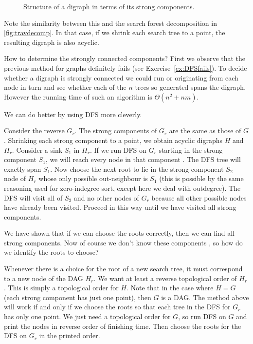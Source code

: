 \begin{figure}[htbp]
%
\caption{Structure of a digraph in terms of its strong components.}
\label{fig:sccdecomp}
\end{figure}

Note the similarity between this and the search forest decomposition
in \cref{fig:travdecomp}. In that case, if we shrink each
search tree to a point, the resulting digraph is also acyclic.

How to determine the strongly connected components? First we observe
that the previous method for graphs definitely fails (see
Exercise~\ref{ex:DFSfails}). To decide whether a digraph is strongly
connected we could run  or 
originating from each node in turn and see whether each of the $n$ trees
so generated spans the digraph. However the running time of such an
algorithm is $\Theta(n^2+nm)$.

We can do better by using DFS more cleverly. 

Consider the reverse $G_r$. The strong components of $G_r$ are the
same as those of $G$. Shrinking each strong component to a point,
we obtain  acyclic digraphs $H$ and $H_r$. Consider a sink $S_1$ in
$H_r$. If we run DFS on $G_r$ starting  in the strong component
$S_1$, we will reach every node in that component . The DFS tree will exactly span $S_1$. Now
choose the next root to lie in the strong component $S_2$ node of
$H_r$ whose only possible out-neighbour is $S_1$ (this is possible
by the same reasoning used for zero-indegree sort, except here we
deal with outdegree). The DFS will visit all of $S_2$ and no other
nodes of $G_r$ because all other possible nodes have already been
visited. Proceed in this way until we have visited all strong
components.

We have shown that if we can choose the roots correctly, then we can
find all strong components. Now of course we don't know these components
, so how do we identify the roots to choose?

Whenever there is a choice for the root of a new search tree, it must
correspond to a new node of the DAG $H_r$. We want at least a reverse
topological order of $H_r$. This is simply a topological order for
$H$. Note that in the case where $H=G$ (each strong component has just
one point), then $G$ is a DAG. The method above will work if and only
if we choose the roots so that each tree in the DFS for $G_r$ has only
one point. We just need a topological order for $G$, so run DFS on $G$
and print the nodes in reverse order of finishing time. Then choose the
roots for the DFS on $G_r$ in the printed order.

